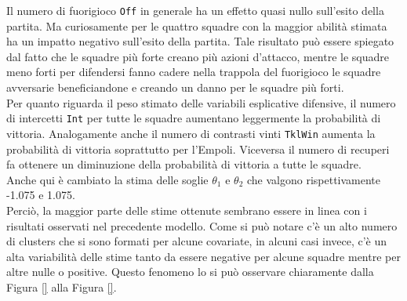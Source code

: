 Il numero di fuorigioco \texttt{Off} in generale ha un effetto quasi nullo sull'esito della partita. Ma curiosamente per le quattro squadre con la maggior abilità stimata ha un impatto negativo sull'esito della partita. Tale risultato può essere spiegato dal fatto che le squadre più forte creano più azioni d'attacco, mentre le squadre meno forti per difendersi fanno cadere nella trappola del fuorigioco le squadre avversarie beneficiandone e creando un danno per le squadre più forti.\\
Per quanto riguarda il peso stimato delle variabili esplicative difensive, il numero di intercetti \texttt{Int} per tutte le squadre aumentano leggermente la probabilità di vittoria. Analogamente anche il numero di contrasti vinti \texttt{TklWin} aumenta la probabilità di vittoria soprattutto per l'Empoli. Viceversa il numero di recuperi fa ottenere un diminuzione della probabilità di vittoria a tutte le squadre.\\
Anche qui è cambiato la stima delle soglie $\theta_1$ e $\theta_2$ che valgono rispettivamente -1.075 e 1.075.\\
Perciò, la maggior parte delle stime ottenute sembrano essere in linea con i risultati osservati nel precedente modello. Come si può notare c'è un alto numero di clusters che si sono formati per alcune covariate, in alcuni casi invece, c'è un alta variabilità delle stime tanto da essere negative per alcune squadre mentre per altre nulle o positive. Questo fenomeno lo si può osservare chiaramente dalla Figura \ref{} alla Figura \ref{}.

\begin{comment}
	Dall’analisi effettuata pertanto emerge che non tutte le squadre ottengono
	gli stessi risultati da determinate situazioni. Per alcune variabili addirittura
	il coefficiente associato è negativo per alcune squadre e positivo per altre.
	Questo aspetto viene evidenziato ancora più chiaramente nelle Figure 8-13.
	I grafici mostrano, per alcune variabili esplicative, come cambiano le stime
	dei coefficienti associati al variare del parametro di regolazione espresso in
	scala logaritmica.
\end{comment}
\begin{comment}
	Esempio descrizione grafico...
	In Figura 11 viene proposto il percorso relativo al coefficiente della variabile
	associata al numero di tiri direttamente da calcio di punizione, in cui
	si evidenziano due squadre (Tottenham e Leicester City) che si discostano
	nettamente dal trend comune come gi`a accennato.
\end{comment}